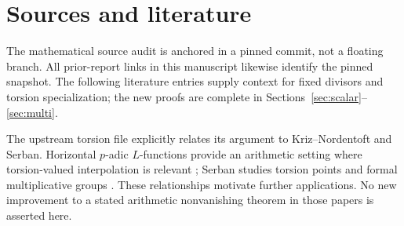 \section{Sources and literature}
\label{sec:sources}
The mathematical source audit is anchored in a pinned commit, not a floating branch. All prior-report links in this manuscript likewise identify the pinned snapshot. The following literature entries supply context for fixed divisors and torsion specialization; the new proofs are complete in Sections~\ref{sec:scalar}--\ref{sec:multi}.

The upstream torsion file explicitly relates its argument to Kriz--Nordentoft and Serban. Horizontal $p$-adic $L$-functions provide an arithmetic setting where torsion-valued interpolation is relevant \cite{kriz}; Serban studies torsion points and formal multiplicative groups \cite{serban}. These relationships motivate further applications. No new improvement to a stated arithmetic nonvanishing theorem in those papers is asserted here.

